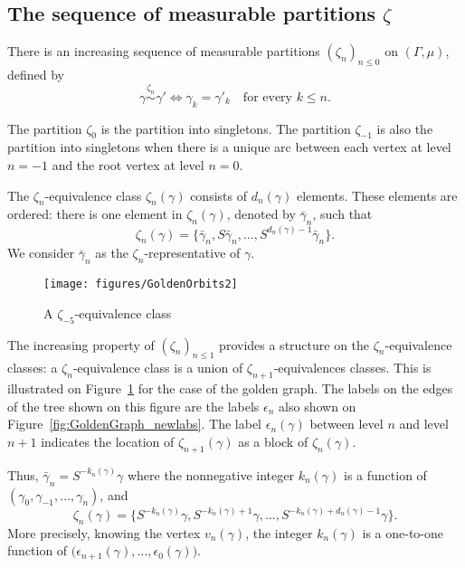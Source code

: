 \documentclass[12pt,a4paper]{article}
\begin{document}
\subsection{The sequence of measurable partitions $\zeta$}

There is an increasing sequence of measurable partitions ${(\zeta_n)}_{n \leq 0}$ 
on $(\Gamma, \mu)$, defined by 
$$
\boxed{\gamma \overset{\zeta_n}{\sim} \gamma' 
\iff \gamma_k=\gamma'_k \quad\text{for every $k \leq n$}}.
$$ 

The partition $\zeta_0$ is the partition into singletons. 
The partition $\zeta_{-1}$ is also the partition into singletons 
when there is a unique arc between each vertex at level $n=-1$ and the root vertex 
at level $n=0$.  

The $\zeta_n$-equivalence class $\zeta_n(\gamma)$ consists of $d_n(\gamma)$ elements. 
These elements are ordered: there is one element in $\zeta_n(\gamma)$, denoted by 
$\bar\gamma_n$, such that 
$$
\boxed{\zeta_n(\gamma)= \{\bar\gamma_n, S\bar\gamma_n, \ldots, S^{d_n(\gamma)-1}\bar\gamma_n\}}.
$$
We consider $\bar\gamma_n$ as the $\zeta_n$-representative of $\gamma$.

\begin{figure}[!h]
\centering
	\texttt{[image: figures/GoldenOrbits2]}
\caption{A $\zeta_{-5}$-equivalence class}
\label{fig:GoldenOrbits}
\end{figure}


The increasing property of ${(\zeta_n)}_{n \leq 1}$ provides a structure 
on the $\zeta_{n}$-equivalence classes: a $\zeta_n$-equivalence class 
is a union of $\zeta_{n+1}$-equivalences classes. 
This is illustrated on Figure~\ref{fig:GoldenOrbits} for the case of the golden graph. 
The labels on the edges of the tree shown on this figure are the labels $\epsilon_n$ 
also shown on Figure~\ref{fig:GoldenGraph_newlabs}. 
The label $\epsilon_n(\gamma)$ between level $n$ and level $n+1$ indicates the location of 
$\zeta_{n+1}(\gamma)$ as a block of $\zeta_n(\gamma)$. 


Thus, $\boxed{\bar\gamma_n = S^{-k_n(\gamma)}\gamma}$ where the nonnegative integer $k_n(\gamma)$ 
is a function of $(\gamma_{0}, \gamma_{-1}, \ldots, \gamma_n)$, and 
$$
\zeta_n(\gamma) = \{S^{-k_n(\gamma)}\gamma, S^{-k_n(\gamma)+1}\gamma, 
\ldots, S^{-k_n(\gamma)+d_n(\gamma)-1}\gamma \}.
$$ 
More precisely, knowing the vertex $v_n(\gamma)$, the integer $k_n(\gamma)$ is 
a one-to-one function of $\bigl(\epsilon_{n+1}(\gamma), \ldots, \epsilon_0(\gamma)\bigr)$. 
\end{document}
